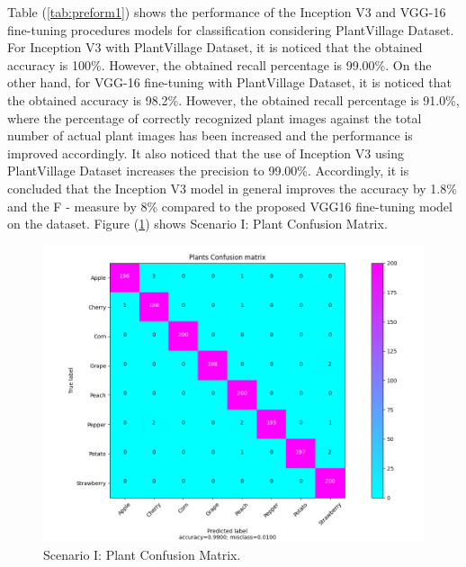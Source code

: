 Table (\ref{tab:preform1}) shows the performance of the Inception V3 and 
VGG-16 fine-tuning procedures models for classification considering PlantVillage
Dataset. For Inception V3 with PlantVillage Dataset, it is noticed that the obtained 
accuracy is 100\%. However, the obtained recall percentage is 99.00\%. 
On the other hand, for VGG-16 fine-tuning with PlantVillage Dataset, it 
is noticed that the obtained accuracy is 98.2\%. However, the obtained
recall percentage is 91.0\%, where the percentage of correctly recognized 
plant images against the total number of actual plant images has been increased 
and the performance is improved accordingly. It also noticed that the use of Inception 
V3 using PlantVillage Dataset increases the precision to 99.00\%. Accordingly, it is concluded
that the Inception V3 model in general improves the accuracy by 1.8\% and the F - measure by 8\% 
compared to the proposed VGG16 fine-tuning model on the dataset. 
Figure (\ref{fig:scenarioI}) shows Scenario I: Plant Confusion Matrix.
\begin{figure}[H]
  \centering
  \includegraphics[width=12cm]{photos/chapter05/5.png}
  \caption{Scenario I: Plant Confusion Matrix.}
  \label{fig:scenarioI}
\end{figure}

